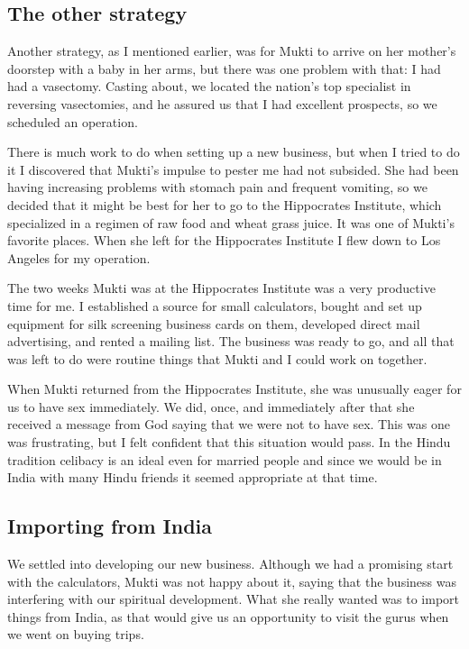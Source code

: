 \documentclass[a5paper,10pt,english]{book}
\begin{document}
\subsection{The other strategy}
\label{\detokenize{psychopaths:the-other-strategy}}
\sphinxAtStartPar
Another strategy, as I mentioned earlier, was for Mukti to arrive on her
mother’s doorstep with a baby in her arms, but there was one problem
with that: I had had a vasectomy. Casting about, we located the nation’s
top specialist in reversing vasectomies, and he assured us that I had
excellent prospects, so we scheduled an operation.

\sphinxAtStartPar
There is much work to do when setting up a new business, but when I
tried to do it I discovered that Mukti’s impulse to pester me had not
subsided. She had been having increasing problems with stomach pain and
frequent vomiting, so we decided that it might be best for her to go to
the Hippocrates Institute, which specialized in a regimen of raw food
and wheat grass juice. It was one of Mukti’s favorite places. When she
left for the Hippocrates Institute I flew down to Los Angeles for my
operation.

\sphinxAtStartPar
The two weeks Mukti was at the Hippocrates Institute was a very
productive time for me. I established a source for small calculators,
bought and set up equipment for silk screening business cards on them,
developed direct mail advertising, and rented a mailing list. The
business was ready to go, and all that was left to do were routine
things that Mukti and I could work on together.

\sphinxAtStartPar
When Mukti returned from the Hippocrates Institute, she was unusually
eager for us to have sex immediately. We did, once, and immediately
after that she received a message from God saying that we were not to
have sex. This was one was frustrating, but I felt confident that this
situation would pass. In the Hindu tradition celibacy is an ideal even
for married people and since we would be in India with many Hindu
friends it seemed appropriate at that time.


\subsection{Importing from India}
\label{\detokenize{psychopaths:importing-from-india}}
\sphinxAtStartPar
We settled into developing our new business. Although we had a promising
start with the calculators, Mukti was not happy about it, saying that
the business was interfering with our spiritual development. What she
really wanted was to import things from India, as that would give us an
opportunity to visit the gurus when we went on buying trips.
\end{document}
